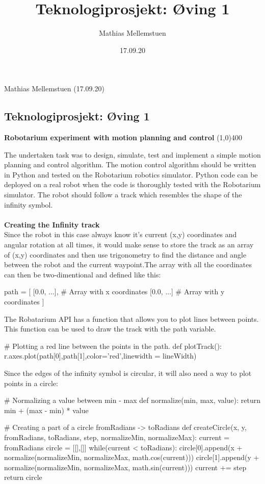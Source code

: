 \documentclass[10pt]{report}
\title{Teknologiprosjekt: Øving 1}
\author{Mathias Mellemstuen}
\date{17.09.20}
\def\lighterText#1{{\color{light}#1}}
\begin{document}
\begin{flushright}
\lighterText{Mathias Mellemstuen (17.09.20)}
\end{flushright}
\begin{center}
\section*{Teknologiprosjekt: Øving 1}
\textbf{Robotarium experiment with motion planning and control}
\line(1,0){400}
\end{center}
The undertaken task was to design, simulate, test and implement a simple motion planning and control algorithm. The motion control algorithm should be written in Python and tested on the Robotarium robotics simulator.
Python code can be deployed on a real robot when the code is thoroughly tested with the Robotarium simulator.
The robot should follow a track which resembles the shape of the infinity symbol.
\\\\
\textbf{Creating the Infinity track}\\
Since the robot in this case always know it's current (x,y) coordinates and angular rotation at all times,
it would make sense to store the track as an array of (x,y) coordinates and then use trigonometry to find
the distance and angle between the robot and the current waypoint.The array with all the coordinates can then be two-dimentional and defined like this: 
\begin{python}
path = [
    [0.0, ...], # Array with x coordinates
    [0.0, ...]  # Array with y coordinates
]
\end{python}
The Robatarium API has a function that allows you to plot lines between points. This function can be used to draw the track with the path variable. 
\begin{python}
# Plotting a red line between the points in the path. 
def plotTrack():
    r.axes.plot(path[0],path[1],color='red',linewidth = lineWidth)
\end{python}
Since the edges of the infinity symbol is circular, it will also need a way to plot points in a circle:
\begin{python}
# Normalizing a value between min - max
def normalize(min, max, value): 
    return min + (max - min) * value 

# Creating a part of a circle fromRadians -> toRadians
def createCircle(x, y, fromRadians, toRadians, step, normalizeMin, normalizeMax): 
    current = fromRadians
    circle = [[],[]]
    while(current < toRadians):
        circle[0].append(x + normalize(normalizeMin, normalizeMax, math.cos(current)))
        circle[1].append(y + normalize(normalizeMin, normalizeMax, math.sin(current)))
        current += step
return circle
\end{python}
\end{document}
